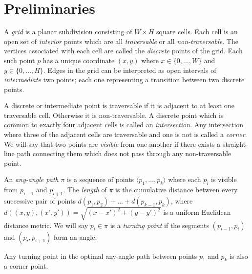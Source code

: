 \section{Preliminaries}
A \emph{grid} is a planar subdivision consisting of $W \times H$ square cells.
Each cell is an open set of \emph{interior} points which are 
all \emph{traversable} or all \emph{non-traversable}.
The vertices associated with each cell are called the
\emph{discrete} points of the grid. Each such point $p$ has a unique coordinate $(x, y)$
where $x \in \{0,\dots,W\}$ and $y \in \{0,\dots,H\}$.
Edges in the grid can be interpreted as open intervals of \emph{intermediate}
two points; each one representing a transition between two discrete points. 
\par
A discrete or intermediate point is traversable if it is adjacent to 
at least one traversable cell. Otherwise it is non-traversable.
A discrete point which is common to exactly four adjacent cells is called an \emph{intersection}.
Any intersection where three of the adjacent cells are traversable and one is not
is called a \emph{corner}.
We will say that two points are \emph{visible} from one another if there exists a 
straight-line path connecting them which does not pass through any non-traversable point.

An \emph{any-angle path} $\pi$ is a sequence of points 
$\langle p_1,\dots,p_k \rangle$ where each $p_{i}$ is visible from $p_{i-1}$
and $p_{i+1}$.
The \emph{length} of $\pi$ 
is the cumulative distance between every successive
pair of points $d(p_1,p_2) + \dots + d(p_{k-1},p_k)$, 
where $d((x,y), (x',y'))= \sqrt{(x-x')^2 + (y-y')^2}$ 
is a uniform Euclidean distance metric.
We will say $p_i \in \pi$ is a \emph{turning point} if the segments
$(p_{i-1}, p_i)$ and $(p_i, p_{i+1})$ form an angle.
\\
\begin{lemma}
\label{lemma::anya::corner}
  Any turning point in the optimal any-angle path between points $p_1$ and 
$p_k$ is also a corner point.
\end{lemma}

